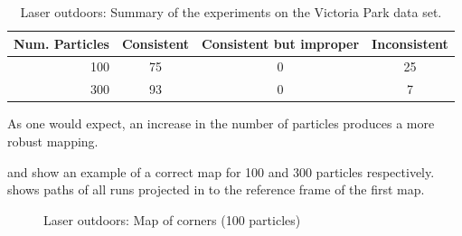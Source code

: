 \begin{table}[ht]
\center
\begin{tabular}{r|c|c|c}
Num. Particles & Consistent & Consistent but improper & Inconsistent\\
\hline
100 & 75  & 0 & 25 \\
300 & 93  & 0 & 7\\
\end{tabular}
\caption{Laser outdoors: Summary of the experiments on the Victoria Park data set.}
\label{tab:results_victoria_park}
\end{table}

As one would expect, an increase in the number of particles produces a
more robust mapping. 

 and  show
an example of a correct map for 100 and 300 particles
respectively.  shows paths of all runs
projected in to the reference frame of the first map.


\begin{figure}[htbp]
  \centering


  \caption{Laser outdoors: Map of corners (100 particles)} %
  \label{fig:trees_map_100p}
\end{figure}

